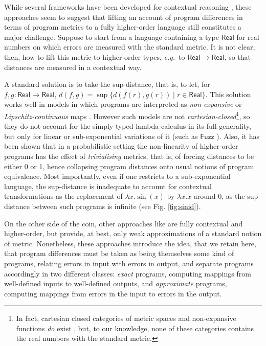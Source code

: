   While several frameworks  have been developed for contextual reasoning \cite{10.1145/1932681.1863568,Gaboardi_2013,Azevedo_de_Amorim_2017,chaudhuri, dallago:differential-stlc},  these approaches seem to suggest that lifting an account of program
differences in terms of program metrics to a fully higher-order language still constitutes a major challenge. 
%
Suppose to start from a language  containing a type $\mathsf{Real}$ for real numbers on which errors are measured with the standard metric. It is not clear, then, how to lift this metric to higher-order types, \emph{e.g.}~to $\mathsf{Real}\to \mathsf{Real}$, so that distances are measured in a contextual way.



A standard solution is to take the sup-distance, that is, to let, for $f,g:\mathsf{Real}\to \mathsf{Real}$, $d(f,g)=\sup\{d(f(r),g(r))\mid r\in \mathsf{Real}\}$. This solution works well in models in which programs are interpreted as \emph{non-expansive} or \emph{Lipschitz-continuous} maps \cite{Hofmann2014, Azevedo_de_Amorim_2017}. However such models are not \emph{cartesian-closed}\footnote{In fact, cartesian closed categories of metric spaces and non-expansive functions \emph{do} exist \cite{Escardo1999, Stubbe2009}, but, to our knowledge, none of these categories contains the real numbers with the standard metric.}, so they do not account for 
 the simply-typed lambda-calculus in its full generality, but only for linear or sub-exponential variations of it (such as $\mathsf{Fuzz}$ \cite{10.1145/1932681.1863568,Gaboardi_2013,Azevedo_de_Amorim_2017}).
 Also, it has been shown \cite{10.1109/LICS.2015.64} that in a probabilistic setting the non-linearity of higher-order programs has the effect of \emph{trivialising} metrics, that is, of forcing distances to be either 0 or 1, hence collapsing program distances onto usual notions of program equivalence.
Most importantly, even if one restricts to a sub-exponential language, the sup-distance is inadequate to account for contextual transformations as the replacement of $\lambda x.\sin(x)$ by $\lambda x.x$ around 0,  as the sup-distance between such programs is infinite (see Fig. \ref{fig:sinid}). 
 
 
On the other side of the coin, other approaches like \cite{chaudhuri, dallago:differential-stlc} are fully contextual and higher-order, but provide, at best, only weak approximations of a standard notion of metric.  
 Nonetheless, these approaches introduce the idea, that we retain here, that program differences must be taken as being themselves some kind of programs, relating errors in input with errors in  output,  and separate programs accordingly in two different classes: \emph{exact} programs, computing mappings from well-defined inputs to well-defined outputs, and \emph{approximate} programs, computing mappings from errors in the input to errors in the output.
%

